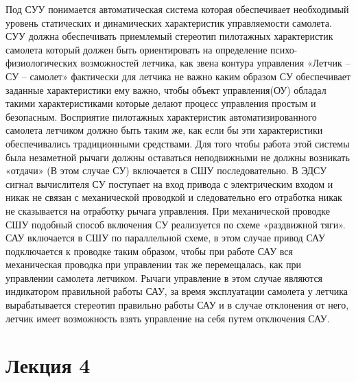 \documentclass{article}
\begin{document}
Под СУУ понимается автоматическая система которая обеспечивает необходимый
уровень статических и динамических характеристик управляемости самолета. СУУ
должна обеспечивать приемлемый стереотип пилотажных характеристик самолета
который должен быть ориентировать на определение психо-физиологических
возможностей летчика, как звена контура управления «Летчик -- СУ -- самолет»
фактически для летчика не важно каким образом СУ обеспечивает заданные
характеристики ему важно, чтобы объект управления(ОУ) обладал такими
характеристиками которые делают процесс управления простым и безопасным.
Восприятие пилотажных характеристик автоматизированного самолета летчиком
должно быть таким же, как если бы эти характеристики обеспечивались
традиционными средствами. Для того чтобы работа этой системы была незаметной
рычаги должны оставаться неподвижными не должны возникать «отдачи» (В этом
случае СУ) включается в СШУ последовательно. В ЭДСУ сигнал вычислителя СУ
поступает на вход привода с электрическим входом и никак не связан с
механической проводкой и следовательно его отработка никак не сказывается на
отработку рычага управления. При механической проводке СШУ подобный способ
включения СУ реализуется по схеме «раздвижной тяги».
САУ включается в СШУ по параллельной схеме, в этом случае привод САУ
подключается к проводке таким образом, чтобы при работе САУ вся механическая
проводка при управлении так же перемещалась, как при управлении самолета
летчиком. Рычаги управление в этом случае являются индикатором правильной
работы САУ, за время эксплуатации самолета у летчика вырабатывается стереотип
правильно работы САУ и в случае отклонения от него, летчик имеет возможность
взять управление на себя путем отключения САУ.
\newpage
\section{Лекция 4}
\end{document}
